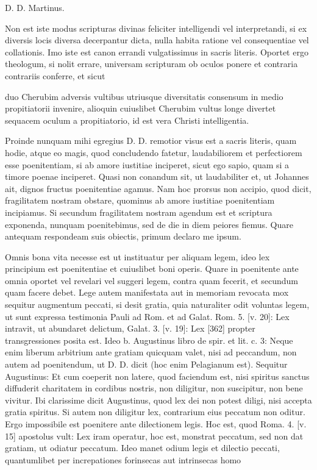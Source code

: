 D. D. Martinus.

Non est iste modus scripturas divinas feliciter intelligendi vel interpretandi, si ex diversis locis diversa decerpantur dicta, nulla habita ratione vel consequentiae vel collationis. Imo iste est canon errandi vulgatissimus in sacris literis. Oportet ergo theologum, si nolit errare, universam scripturam ob oculos ponere et contraria contrariis conferre, et sicut

duo Cherubim adversis vultibus utriusque diversitatis consensum in medio propitiatorii invenire, alioquin cuiuslibet Cherubim vultus longe divertet sequacem oculum a propitiatorio, id est vera Christi intelligentia.

Proinde nunquam mihi egregius D. D. remotior visus est a sacris literis, quam hodie, atque eo magis, quod concludendo fatetur, laudabiliorem et perfectiorem esse poenitentiam, si ab amore iustitiae inciperet, sicut ego sapio, quam si a timore poenae inciperet. Quasi non conandum sit, ut laudabiliter et, ut Johannes ait, dignos fructus poenitentiae agamus. Nam hoc prorsus non accipio, quod dicit, fragilitatem nostram obstare, quominus ab amore iustitiae poenitentiam incipiamus. Si secundum fragilitatem nostram agendum est et scriptura exponenda, nunquam poenitebimus, sed de die in diem peiores fiemus. Quare antequam respondeam suis obiectis, primum declaro me ipsum.

Omnis bona vita necesse est ut instituatur per aliquam legem, ideo lex principium est poenitentiae et cuiuslibet boni operis. Quare in poenitente ante omnia oportet vel revelari vel suggeri legem, contra quam fecerit, et secundum quam facere debet. Lege autem manifestata aut in memoriam revocata mox sequitur augmentum peccati, si desit gratia, quia naturaliter odit voluntas legem, ut sunt expressa testimonia Pauli ad Rom. et ad Galat. Rom. 5. [v. 20]: Lex intravit, ut abundaret delictum, Galat. 3. [v. 19]: Lex [362] propter transgressiones posita est. Ideo b. Augustinus libro de spir. et lit. c. 3: Neque enim liberum arbitrium ante gratiam quicquam valet, nisi ad peccandum, non autem ad poenitendum, ut D. D. dicit (hoc enim Pelagianum est). Sequitur Augustinus: Et cum coeperit non latere, quod faciendum est, nisi spiritus sanctus diffuderit charitatem in cordibus nostris, non diligitur, non suscipitur, non bene vivitur. Ibi clarissime dicit Augustinus, quod lex dei non potest diligi, nisi accepta gratia spiritus. Si autem non diligitur lex, contrarium eius peccatum non oditur. Ergo impossibile est poenitere ante dilectionem legis. Hoc est, quod Roma. 4. [v. 15] apostolus vult: Lex iram operatur, hoc est, monstrat peccatum, sed non dat gratiam, ut odiatur peccatum. Ideo manet odium legis et dilectio peccati, quantumlibet per increpationes forinsecas aut intrinsecas homo

